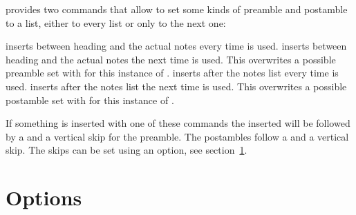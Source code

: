 \documentclass[toc=bib,toc=index]{cnpkgdoc}
\makeatletter
\providecommand*\sinceversion[1]{%
  \@bsphack
  \marginnote{%
    \footnotesize\sffamily\RaggedRight
    \textcolor{black!75}{Introduced in version~#1}}%
  \@esphack}
\makeatother
\begin{document}
\enotez provides two commands that allow to set some kinds of preamble and
postamble to a list, either to every list or only to the next one:
\begin{beschreibung}
 \newline\sinceversion{0.5}%
   inserts  between heading and the actual notes every time
    is used.
 \newline\sinceversion{0.5}%
   inserts  between heading and the actual notes the next time
    is used. This overwrites a possible preamble set with
    for this instance of .
 \newline\sinceversion{0.5}%
   inserts  after the notes list every time  is
   used.
 \newline\sinceversion{0.5}%
   inserts  after the notes list the next time 
   is used. This overwrites a possible postamble set with
    for this instance of .
\end{beschreibung}
If something is inserted with one of these commands the inserted 
will be followed by a  and a vertical skip for the preamble. The postambles
follow a  and a vertical skip. The skips can be set using an option,
see section~\ref{sec:options}.

\section{Options}\label{sec:options}
\end{document}
